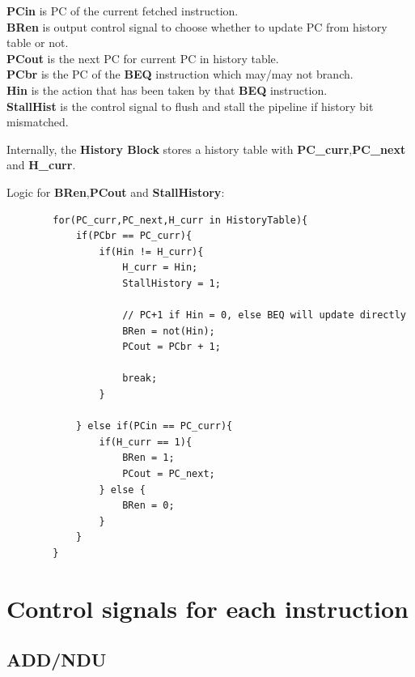 \documentclass{article}
\begin{document}
\textbf{PCin} is PC of the current fetched instruction.\\
\textbf{BRen} is output control signal to choose whether to update PC from
history table or not.\\
\textbf{PCout} is the next PC for current PC in history table.\\

\textbf{PCbr} is the PC of the \textbf{BEQ} instruction which may/may not branch.\\
\textbf{Hin} is the action that has been taken by that \textbf{BEQ} instruction.\\

\textbf{StallHist} is the control signal to flush and stall the pipeline if
history bit mismatched.

Internally, the \textbf{History Block} stores a history table with 
\textbf{PC\_curr},\textbf{PC\_next} and \textbf{H\_curr}.

Logic for \textbf{BRen},\textbf{PCout} and \textbf{StallHistory}:
    \begin{lstlisting}
        for(PC_curr,PC_next,H_curr in HistoryTable){
            if(PCbr == PC_curr){
                if(Hin != H_curr){
                    H_curr = Hin;
                    StallHistory = 1;

                    // PC+1 if Hin = 0, else BEQ will update directly
                    BRen = not(Hin);
                    PCout = PCbr + 1; 

                    break;
                }

            } else if(PCin == PC_curr){
                if(H_curr == 1){
                    BRen = 1;
                    PCout = PC_next;
                } else {
                    BRen = 0;
                }
            }
        }
    \end{lstlisting}


\section*{Control signals for each instruction}
\subsection*{ADD/NDU}
\end{document}
